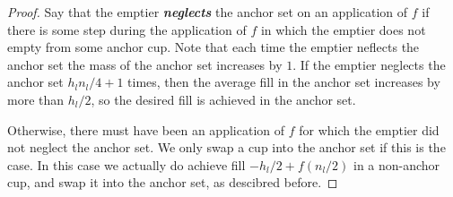 \documentclass[twocolumn]{article}[11pt]
\newcommand{\defn}[1]{{\textit{\textbf{\boldmath #1}}}}
\begin{document}
\begin{proof}
  Say that the emptier \defn{neglects} the anchor set on an application of $f$
  if there is some step during the application of $f$ in which the emptier does
  not empty from some anchor cup. Note that each time the emptier neflects the
  anchor set the mass of the anchor set increases by $1$. If the emptier
  neglects the anchor set $h_l n_l/4 + 1$ times, then the  average fill in the
  anchor set increases by more than $h_l/2$, so the desired fill is achieved in
  the anchor set.

  Otherwise, there must have been an application of $f$ for which the emptier
  did not neglect the anchor set. We only swap a cup into the anchor set if
  this is the case. In this case we actually do achieve fill $-h_l/2 +
  f(n_l/2)$ in a non-anchor cup, and swap it into the anchor set, as descibred
  before.
\end{proof}
\end{document}
